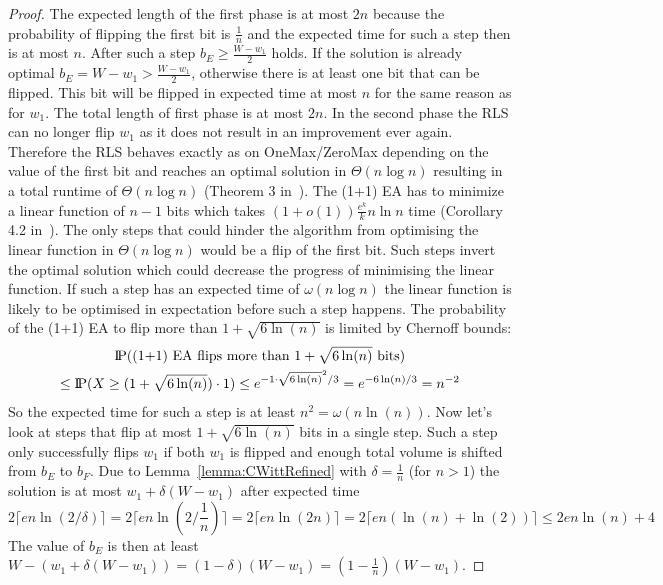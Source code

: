 \begin{proof}
    The expected length of the first phase is at most $2n$ because the probability of flipping the first bit is $\frac{1}{n}$ and the expected time for such a step then is at most $n$.
    After such a step $b_E \ge \frac {W-w_1}{2}$ holds.
    If the solution is already optimal $b_E = W-w_1>\frac {W-w_1}{2}$, otherwise there is at least one bit that can be flipped.
    This bit will be flipped in expected time at most $n$ for the same reason as for $w_1$.
    The total length of first phase is at most $2n$.
    In the second phase the RLS can no longer flip $w_1$ as it does not result in an improvement ever again.
    Therefore the RLS behaves exactly as on OneMax/ZeroMax depending on the value of the first bit and reaches an optimal solution in $\Theta(n\log{}n)$ resulting in a total runtime of $\Theta(n\log{}n)$ (Theorem 3 in~\cite{witt2014fitness}).\newline
    The (1+1) EA has to minimize a linear function of $n-1$ bits which takes $(1+o(1))\frac{e^k}{k}n\ln n$ time (Corollary 4.2 in~\cite{witt2013tight}).
    The only steps that could hinder the algorithm from optimising the linear function in $\Theta(n\log{}n)$ would be a flip of the first bit.
    Such steps invert the optimal solution which could decrease the progress of minimising the linear function.
    If such a step has an expected time of $\omega(n\log{}n)$ the linear function is likely to be optimised in expectation before such a step happens.
    The probability of the (1+1) EA to flip more than $1+\sqrt{6\ln(n)}$ is limited by Chernoff bounds:
    \begin{gather}
        \nonumber \text{I\kern-0.15em P}(\text{(1+1) EA flips more than }1+\sqrt{6\ln(n)}\text{ bits})\\ \nonumber
        \le\text{I\kern-0.15em P}(X\ge (1+\sqrt{6\ln(n)})\cdot 1)
        \le e^{-1\cdot{\sqrt{6\ln(n)}}^2/3}
        = e^{-6\ln(n)/3}
        = n^{-2}
    \end{gather}
    So the expected time for such a step is at least \(n^2=\omega(n\ln(n))\).
    Now let's look at steps that flip at most $1+\sqrt{6\ln(n)}$ bits in a single step.
    Such a step only successfully flips $w_1$ if both $w_1$ is flipped and enough total volume is shifted from $b_E$ to $b_F$.
    Due to Lemma~\ref{lemma:CWittRefined} with $\delta=\frac{1}{n}$ (for $n>1$) the solution is at most $w_1+\delta(W-w_1)$ after expected time
    \[
        2\lceil en\ln(2/\delta)\rceil
        =2\lceil en\ln(2/\frac{1}{n})\rceil
        =2\lceil en\ln(2n)\rceil
        =2\lceil en(\ln(n)+\ln(2))\rceil
        \le 2en\ln(n)+4
    \]
    The value of $b_E$ is then at least \(W-(w_1+\delta(W-w_1))=(1-\delta)(W-w_1)=(1-\frac{1}{n})(W-w_1)\).

\end{proof}
